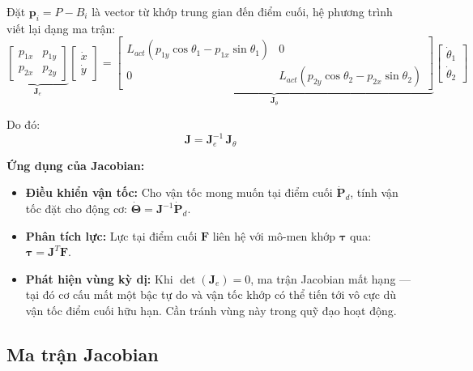 Đặt $\mathbf{p}_i = P - B_i$ là vector từ khớp trung gian đến điểm cuối,
hệ phương trình viết lại dạng ma trận:
\begin{equation}
    \underbrace{\begin{bmatrix}
        p_{1x} & p_{1y} \\
        p_{2x} & p_{2y}
    \end{bmatrix}}_{\mathbf{J}_e}
    \begin{bmatrix}\dot{x}\\\dot{y}\end{bmatrix}
    =
    \underbrace{\begin{bmatrix}
        L_{act}(p_{1y}\cos\theta_1 - p_{1x}\sin\theta_1) & 0 \\
        0 & L_{act}(p_{2y}\cos\theta_2 - p_{2x}\sin\theta_2)
    \end{bmatrix}}_{\mathbf{J}_\theta}
    \begin{bmatrix}\dot{\theta}_1\\\dot{\theta}_2\end{bmatrix}
    \label{eq:jacobian_system}
\end{equation}

Do đó:
\begin{equation}
    \mathbf{J} = \mathbf{J}_e^{-1}\,\mathbf{J}_\theta
    \label{eq:jacobian_formula}
\end{equation}

\textbf{Ứng dụng của Jacobian:}
\begin{itemize}
    \item \textbf{Điều khiển vận tốc:} Cho vận tốc mong muốn tại điểm cuối
    $\dot{\mathbf{P}}_d$, tính vận tốc đặt cho động cơ:
    $\dot{\boldsymbol{\Theta}} = \mathbf{J}^{-1}\dot{\mathbf{P}}_d$.
    \item \textbf{Phân tích lực:} Lực tại điểm cuối $\mathbf{F}$ liên hệ với
    mô-men khớp $\boldsymbol{\tau}$ qua:
    $\boldsymbol{\tau} = \mathbf{J}^T \mathbf{F}$.
    \item \textbf{Phát hiện vùng kỳ dị:} Khi $\det(\mathbf{J}_e) = 0$,
    ma trận Jacobian mất hạng --- tại đó cơ cấu mất một bậc tự do và vận tốc
    khớp có thể tiến tới vô cực dù vận tốc điểm cuối hữu hạn. Cần tránh
    vùng này trong quỹ đạo hoạt động.
\end{itemize}


\subsection{Ma trận Jacobian}

